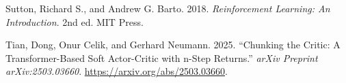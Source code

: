 \documentclass[
  american,
]{article}
\newlength{\cslhangindent}
\newenvironment{CSLReferences}[2] %
 {\begin{list}{}{%
  \setlength{\itemindent}{0pt}
  \setlength{\leftmargin}{0pt}
  \setlength{\parsep}{0pt}
  \ifodd #1
   \setlength{\leftmargin}{\cslhangindent}
   \setlength{\itemindent}{-1\cslhangindent}
  \fi
  \setlength{\itemsep}{#2\baselineskip}}}
 {\end{list}}
\begin{document}
\begin{CSLReferences}{1}{0}
Sutton, Richard S., and Andrew G. Barto. 2018. \emph{Reinforcement
Learning: An Introduction}. 2nd ed. MIT Press.

Tian, Dong, Onur Celik, and Gerhard Neumann. 2025. {``Chunking the
Critic: A Transformer-Based Soft Actor-Critic with n-Step Returns.''}
\emph{arXiv Preprint arXiv:2503.03660}.
\url{https://arxiv.org/abs/2503.03660}.

\end{CSLReferences}
\end{document}
